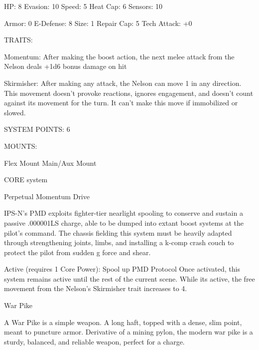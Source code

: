   HP: 8           Evasion: 10                            Speed: 5            Heat Cap: 6        Sensors: 10 

  Armor: 0        E-Defense: 8                           Size: 1             Repair Cap: 5      Tech Attack:  
                                                                                                +0 

                                                     TRAITS: 

  Momentum: After making the boost action, the next melee attack from the Nelson deals +1d6 bonus  
  damage on hit
 
  Skirmisher: After making any attack, the Nelson can move 1 in any direction. This movement doesn’t  
  provoke reactions, ignores engagement, and doesn’t count against its movement for the turn. It can’t  
  make this move if immobilized or slowed. 

                                               SYSTEM POINTS: 6 

                                                    MOUNTS: 

  Flex Mount                          Main/Aux Mount 

                                                  CORE system 

                                                                                                                


                                             Perpetual Momentum Drive 

  IPS-N’s PMD exploits fighter-tier nearlight spooling to conserve and sustain a passive .000001LS 
  charge, able to be dumped into extant boost systems at the pilot’s command. The chassis fielding this 
  system must be heavily adapted through strengthening joints, limbs, and installing a k-comp crash 
  couch to protect the pilot from sudden g force and shear. 

  Active (requires 1 Core Power): Spool up PMD 
   Protocol 
   Once activated, this system remains active until the rest of the current scene. While its active, the free 
   movement from the Nelson’s Skirmisher trait increases to 4. 

War Pike  

A War Pike is a simple weapon. A long haft, topped with a dense, slim point, meant to puncture armor.  
Derivative of a mining pylon, the modern war pike is a sturdy, balanced, and reliable weapon, perfect for a  
charge.    


